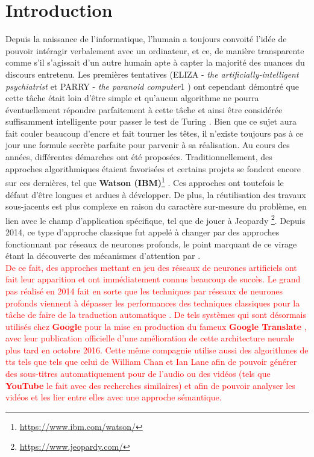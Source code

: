 \section{Introduction}

Depuis la naissance de l'informatique, l'humain a toujours convoité l'idée de pouvoir intéragir verbalement avec un ordinateur, et ce, de manière transparente comme s'il s'agissait d'un autre humain apte à capter la majorité des nuances du discours entretenu. Les premières tentatives (ELIZA - \textit{the artificially-intelligent psychiatrist} \cite{elizaWeizenbaum} et PARRY - \textit{the paranoid computer}1 \cite{parryCerf}) ont cependant démontré que cette tâche était loin d'être simple et qu'aucun algorithme ne pourra éventuellement répondre parfaitement à cette tâche et ainsi être considérée suffisamment intelligente pour passer le test de Turing \cite{turingTest}. Bien que ce sujet aura fait couler beaucoup d'encre et fait tourner les têtes, il n'existe toujours pas à ce jour une formule secrète parfaite pour parvenir à sa réalisation. Au cours des années, différentes démarches ont été proposées. Traditionnellement, des approches algorithmiques étaient favorisées et certains projets se fondent encore sur ces dernières, tel que \textbf{Watson (IBM)}\footnote{\url{https://www.ibm.com/watson/}} \cite{ibmWatson}. Ces approches ont toutefois le défaut d'être longues et ardues à développer. De plus, la réutilisation des travaux sous-jacents est plus complexe en raison du caractère sur-mesure du problème, en lien avec le champ d'application spécifique, tel que de jouer à Jeopardy \footnote{\url{https://www.jeopardy.com/}}. Depuis 2014, ce type d'approche classique fut appelé à changer par des approches fonctionnant par réseaux de neurones profonds, le point marquant de ce virage étant la découverte des mécanismes d'attention par \cite{attentionMechanism}. \\

\textcolor{red}{De ce fait, des approches mettant en jeu des réseaux de neurones artificiels ont fait leur apparition et ont immédiatement connus beaucoup de succès. Le grand pas réalisé en 2014 fait en sorte que les techniques par réseaux de neurones profonds viennent à dépasser les performances des techniques classiques pour la tâche de faire de la traduction automatique \cite{attentionMechanism}. De tels systèmes qui sont désormais utilisés chez \textbf{Google} pour la mise en production du fameux \textbf{Google Translate} \cite{googleTranslate}, avec leur publication officielle d'une amélioration de cette architecture neurale plus tard en octobre 2016. Cette même compagnie utilise aussi des algorithmes de \gls{tts} tels que tels que celui de William Chan et Ian Lane \cite{acousticModeling} afin de pouvoir générer des sous-titres automatiquement pour de l'audio ou des vidéos (tels que \textbf{YouTube} le fait avec des recherches similaires) et afin de pouvoir analyser les vidéos et les lier entre elles avec une approche sémantique.} \\

